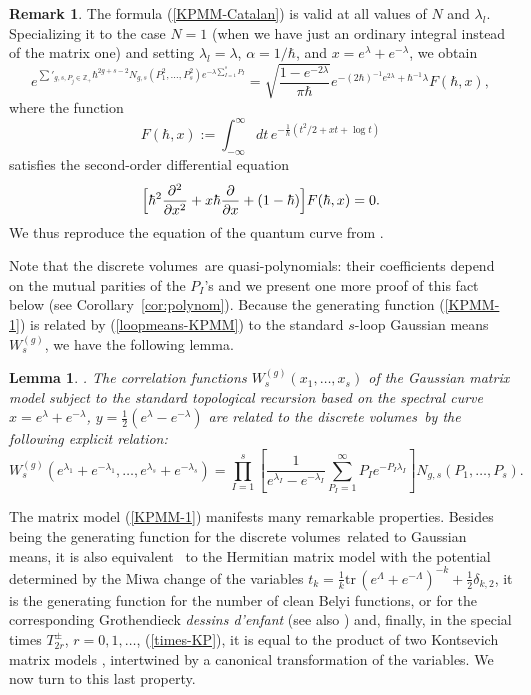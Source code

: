 \documentclass[11pt]{article}
\def\tr{{\mathrm{tr\,}}}
\def\beq{\begin{equation}}
\def\eeq{\end{equation}}
\theoremstyle{plain}
\newtheorem{lemma}{Lemma}
\theoremstyle{definition}
\newtheorem{remark}{Remark}
\def\beq{\begin{equation}}
\def\eeq{\end{equation}}
\newcommand {\dvol}{discrete volumes}%
\begin{document}
\begin{remark}\label{rm:Mulase}
The formula (\ref{KPMM-Catalan}) is valid at all values of $N$ and $\lambda_l$. Specializing it to the case $N=1$ (when
we have just an ordinary integral instead of the matrix one) and setting $\lambda_l=\lambda$, $\alpha=1/\hbar$, and $x=e^{\lambda}+e^{-\lambda}$, we obtain
$$
e^{\sum'_{g,s,P_j\in {\mathbb Z}_+}\hbar^{2g+s-2} N_{g,s}(P_1^2,\dots,P_s^2)e^{-\lambda\sum_{I=1}^s P_I}}
=\sqrt{\frac{1-e^{-2\lambda}}{\pi\hbar}}e^{ -({2\hbar})^{-1}e^{2\lambda}+\hbar^{-1}\lambda}F(\hbar,x),
$$
where the function
$$
F(\hbar,x):= \int_{-\infty}^\infty dt\, e^{-\frac{1}{\hbar}(t^2/2+xt+\log t)}
$$
satisfies the second-order differential equation
$$
\Bigl[\hbar^2 \frac{\partial^2 }{\partial x^2}+x \hbar\frac{\partial }{\partial x}+(1-\hbar)\Bigr] F(\hbar,x)=0.
$$
We thus reproduce the equation of the quantum curve from \cite{DM14}.
\end{remark}


Note that the \dvol\  are quasi-polynomials: their coefficients depend on the mutual parities of the
$P_I$'s and we present one more proof of this fact below (see Corollary~\ref{cor:polynom}).
Because the generating function (\ref{KPMM-1})
is related by (\ref{loopmeans-KPMM}) to the standard $s$-loop Gaussian means $W_s^{(g)}$, we have the following lemma.

\begin{lemma}\label{lm:Norbury}{\rm\cite{ACNP}.}
The correlation functions $W_s^{(g)}(x_1,\dots,x_s)$ of the Gaussian matrix model subject to the
standard topological recursion based on
the spectral curve $x=e^{\lambda}+e^{-\lambda}$, $y=\frac{1}{2}(e^{\lambda}-e^{-\lambda})$ are related to
the \dvol\  by the following explicit relation:
\beq
W_s^{(g)}(e^{\lambda_1}+e^{-\lambda_1},\dots,e^{\lambda_s}+e^{-\lambda_s})
=\prod_{I=1}^s \left[\frac{1}{e^{\lambda_I}-e^{-\lambda_I}}
\sum_{P_I=1}^\infty P_Ie^{-P_I\lambda_I}\right] N_{g,s}(P_1,\dots,P_s).
\label{Norbury-rel}
\eeq
\end{lemma}

The matrix model (\ref{KPMM-1}) manifests many remarkable
properties. Besides being the generating function for the \dvol\  related to Gaussian means, it is also
equivalent~\cite{ChMak2,KMMMZ} to the Hermitian matrix model with the potential determined by the Miwa change of the variables 
$t_k=\frac{1}{k}\tr (e^\Lambda+e^{-\Lambda})^{-k}+\frac12 \delta_{k,2}$, it is the generating function for the number of clean Belyi functions, or for 
the corresponding Grothendieck {\em dessins d'enfant} \cite{AmCh14} (see also \cite{AMMN})
and, finally, in the special times $T^{\pm}_{2r}$, $r=0,1,\dots$, (\ref{times-KP}), it is equal to the product of two Kontsevich matrix
models \cite{Ch95}, intertwined by a canonical transformation of the variables. We now turn to this last property.
\end{document}
